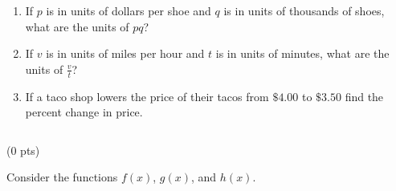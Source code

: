 \documentclass{ximera}
\begin{document}
\begin{enumerate}[label=(\alph*)]
    \item If $p$ is in units of dollars per shoe and $q$ is in units of thousands of shoes, what are the units of $pq$? \vspace{5cm}
    \item If $v$ is in units of miles per hour and $t$ is in units of minutes, what are the units of $\frac{v}{t}$? \vspace{5cm}
    \item If a taco shop lowers the price of their tacos from $\$4.00$ to $\$3.50$ find the percent change in price. 
\end{enumerate}



\newpage $\,$
\newpage


 (0 pts)

Consider the functions $f(x)$, $g(x)$, and $h(x)$.
\end{document}
